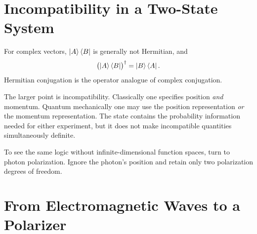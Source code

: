 \begin{classroomqa}
\end{classroomqa}

\section{Incompatibility in a Two-State System}

For complex vectors, \(\left\lvert A\right\rangle\left\langle B\right\rvert\) is generally not Hermitian, and
\begin{equation}
  \bigl(\left\lvert A\right\rangle\left\langle B\right\rvert\bigr)^\dagger=\left\lvert B\right\rangle\left\langle A\right\rvert.
  \label{eq:dyad-adjoint}
\end{equation}
Hermitian conjugation is the operator analogue of complex conjugation.

\begin{classroomqa}
\end{classroomqa}

The larger point is incompatibility. Classically one specifies position
\textit{and} momentum. Quantum mechanically one may use the position
representation \textit{or} the momentum representation. The state contains
the probability information needed for either experiment, but it does not
make incompatible quantities simultaneously definite.

To see the same logic without infinite-dimensional function spaces, turn to
photon polarization. Ignore the photon's position and retain only two
polarization degrees of freedom.

\section{From Electromagnetic Waves to a Polarizer}

